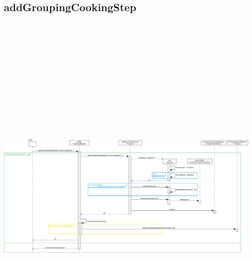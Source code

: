 \subsection{addGroupingCookingStep}
\includegraphics[max width=\textwidth, max height=190mm]{../resources/img/GRP/DSD/op2a.png}
\endgroup

\begingroup\centering
\renewcommand{\thesection}{3}
